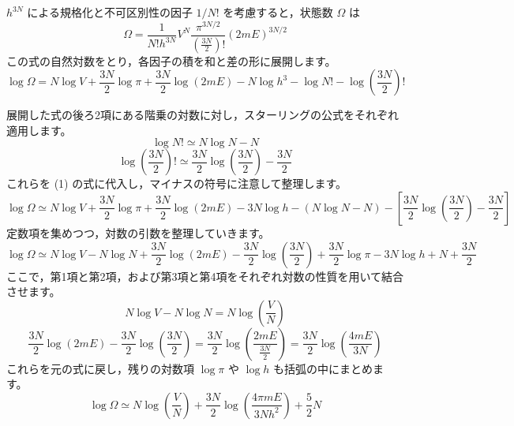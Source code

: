 \solutionheading
\begin{solutionparts}

$h^{3N}$ による規格化と不可区別性の因子 $1/N!$ を考慮すると，状態数 $\Omega$ は
\begin{equation*}
\Omega = \frac{1}{N! h^{3N}} V^N \frac{\pi^{3N/2}}{\left(\frac{3N}{2}\right)!} (2mE)^{3N/2}
\end{equation*}
この式の自然対数をとり，各因子の積を和と差の形に展開します。
\begin{equation*}
\log \Omega = N \log V + \frac{3N}{2} \log \pi + \frac{3N}{2} \log (2mE) - N \log h^3 - \log N! - \log \left(\frac{3N}{2}\right)!
\end{equation*}

展開した式の後ろ2項にある階乗の対数に対し，スターリングの公式をそれぞれ適用します。
\begin{equation*}
\log N! \simeq N \log N - N
\end{equation*}
\begin{equation*}
\log \left(\frac{3N}{2}\right)! \simeq \frac{3N}{2} \log \left(\frac{3N}{2}\right) - \frac{3N}{2}
\end{equation*}
これらを (1) の式に代入し，マイナスの符号に注意して整理します。
\begin{equation*}
\log \Omega \simeq N \log V + \frac{3N}{2} \log \pi + \frac{3N}{2} \log (2mE) - 3N \log h - (N \log N - N) - \left[ \frac{3N}{2} \log \left(\frac{3N}{2}\right) - \frac{3N}{2} \right]
\end{equation*}
定数項を集めつつ，対数の引数を整理していきます。
\begin{equation*}
\log \Omega \simeq N \log V - N \log N + \frac{3N}{2} \log (2mE) - \frac{3N}{2} \log \left(\frac{3N}{2}\right) + \frac{3N}{2} \log \pi - 3N \log h + N + \frac{3N}{2}
\end{equation*}
ここで，第1項と第2項，および第3項と第4項をそれぞれ対数の性質を用いて結合させます。
\begin{equation*}
N \log V - N \log N = N \log \left( \frac{V}{N} \right)
\end{equation*}
\begin{equation*}
\frac{3N}{2} \log (2mE) - \frac{3N}{2} \log \left(\frac{3N}{2}\right) = \frac{3N}{2} \log \left( \frac{2mE}{\frac{3N}{2}} \right) = \frac{3N}{2} \log \left( \frac{4mE}{3N} \right)
\end{equation*}
これらを元の式に戻し，残りの対数項 $\log \pi$ や $\log h$ も括弧の中にまとめます。
\begin{equation*}
\log \Omega \simeq N \log \left( \frac{V}{N} \right) + \frac{3N}{2} \log \left( \frac{4\pi m E}{3N h^2} \right) + \frac{5}{2}N
\end{equation*}


\end{solutionparts}
